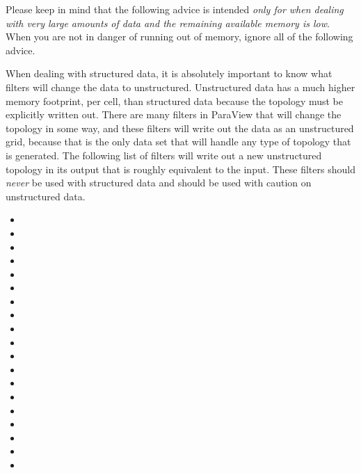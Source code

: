 Please keep in mind that the following advice is intended \emph{only for
  when dealing with very large amounts of data and the remaining available
  memory is low}.  When you are not in danger of running out of memory,
ignore all of the following advice.

When dealing with structured data, it is absolutely important to know what
filters will change the data to unstructured.  Unstructured data has a much
higher memory footprint, per cell, than structured data because the
topology must be explicitly written out.  There are many filters in
ParaView that will change the topology in some way, and these filters will
write out the data as an unstructured grid, because that is the only data
set that will handle any type of topology that is generated.  The following
list of filters will write out a new unstructured topology in its output
that is roughly equivalent to the input.  These filters should \emph{never}
be used with structured data and should be used with caution on
unstructured data.


\begin{multicols}{2}
  \begin{itemize}
  \item {}
  \item {}
  \item {}
  \item {}
  \item {}
  \item {}
  \item {}
  \item {}
  \item {}
  \item {}
  \item {}
  \item {}
  \item {}
  \item {}
  \item {}
  \item {}
  \item {}
  \item {}
  \item {}
  \end{itemize}
\end{multicols}


